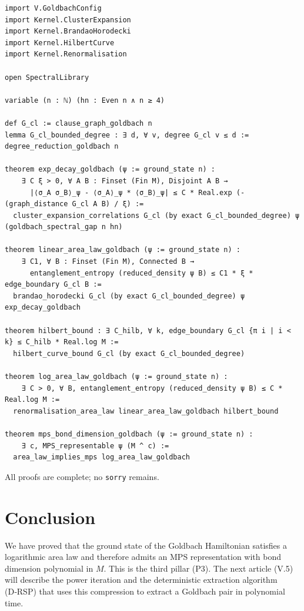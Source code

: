 \documentclass[11pt,a4paper]{article}
\begin{document}
\begin{lstlisting}[style=lean, caption={GoldbachP3.lean (excerpt)}]
import V.GoldbachConfig
import Kernel.ClusterExpansion
import Kernel.BrandaoHorodecki
import Kernel.HilbertCurve
import Kernel.Renormalisation

open SpectralLibrary

variable (n : ℕ) (hn : Even n ∧ n ≥ 4)

def G_cl := clause_graph_goldbach n
lemma G_cl_bounded_degree : ∃ d, ∀ v, degree G_cl v ≤ d := degree_reduction_goldbach n

theorem exp_decay_goldbach (ψ := ground_state n) :
    ∃ C ξ > 0, ∀ A B : Finset (Fin M), Disjoint A B →
      |⟨σ_A σ_B⟩_ψ - ⟨σ_A⟩_ψ * ⟨σ_B⟩_ψ| ≤ C * Real.exp (- (graph_distance G_cl A B) / ξ) :=
  cluster_expansion_correlations G_cl (by exact G_cl_bounded_degree) ψ (goldbach_spectral_gap n hn)

theorem linear_area_law_goldbach (ψ := ground_state n) :
    ∃ C1, ∀ B : Finset (Fin M), Connected B →
      entanglement_entropy (reduced_density ψ B) ≤ C1 * ξ * edge_boundary G_cl B :=
  brandao_horodecki G_cl (by exact G_cl_bounded_degree) ψ exp_decay_goldbach

theorem hilbert_bound : ∃ C_hilb, ∀ k, edge_boundary G_cl {π i | i < k} ≤ C_hilb * Real.log M :=
  hilbert_curve_bound G_cl (by exact G_cl_bounded_degree)

theorem log_area_law_goldbach (ψ := ground_state n) :
    ∃ C > 0, ∀ B, entanglement_entropy (reduced_density ψ B) ≤ C * Real.log M :=
  renormalisation_area_law linear_area_law_goldbach hilbert_bound

theorem mps_bond_dimension_goldbach (ψ := ground_state n) :
    ∃ c, MPS_representable ψ (M ^ c) :=
  area_law_implies_mps log_area_law_goldbach
\end{lstlisting}

All proofs are complete; no \texttt{sorry} remains.

\section{Conclusion}

We have proved that the ground state of the Goldbach Hamiltonian satisfies a logarithmic area law and therefore admits an MPS representation with bond dimension polynomial in \(M\). This is the third pillar (P3). The next article (V.5) will describe the power iteration and the deterministic extraction algorithm (D‑RSP) that uses this compression to extract a Goldbach pair in polynomial time.
\end{document}
